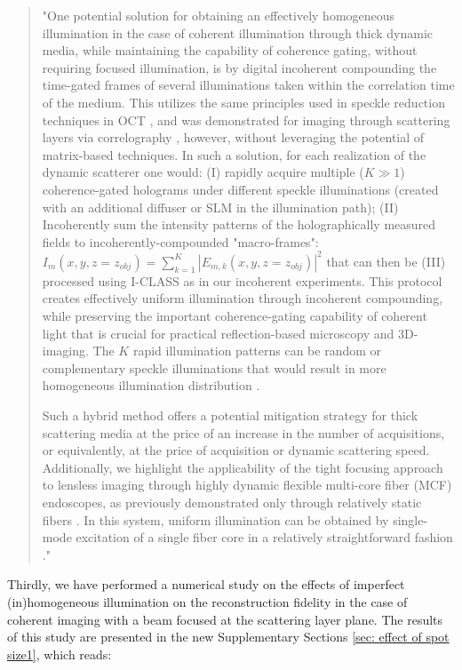 \documentclass[12pt]{article}
\newenvironment{finished_ourresponse}
    {\begin{tcolorbox}[width=\linewidth,breakable,enhanced,colback=gray!5,colframe=finished_responsecolor!50,title=Response,left=5pt,right=5pt]}
    {\end{tcolorbox}}
\begin{document}
\begin{finished_ourresponse}
\begin{quote}
     "One potential solution for obtaining an effectively homogeneous illumination in the case of coherent illumination through thick dynamic media, while maintaining the capability of coherence gating, without requiring focused illumination, is by digital incoherent compounding the time-gated frames of several illuminations taken within the correlation time of the medium. This utilizes the same principles used in speckle reduction techniques in OCT \cite{liba2017speckle}, and was demonstrated for imaging through scattering layers via correlography \cite{idell1987image, salhov2018depth, metzler2020deepinverse}, however, without leveraging the potential of matrix-based techniques.
     In such a solution, for each realization of the dynamic scatterer one would: (I) rapidly acquire multiple ($K \gg 1$) coherence-gated holograms under different speckle illuminations (created with an additional diffuser or SLM in the illumination path); (II) Incoherently sum the intensity patterns of the holographically measured fields to incoherently-compounded "macro-frames": $I_m(x,y,z=z_{obj}) = \sum_{k=1}^{K}|E_{m,k}(x,y,z=z_{obj})|^2$  that can then be (III) processed using I-CLASS as in our incoherent experiments.
     This protocol creates effectively uniform illumination through incoherent compounding, while preserving the important coherence-gating capability of coherent light that is crucial for practical reflection-based microscopy and 3D-imaging. The $K$ rapid illumination patterns can be random or complementary speckle illuminations that would result in more homogeneous illumination distribution \cite{gateau2017complementary}.

     Such a hybrid method offers a potential mitigation strategy for thick scattering media at the price of an increase in the number of acquisitions, or equivalently, at the price of acquisition or dynamic scattering speed.
     Additionally, we highlight the applicability of the tight focusing approach to lensless imaging through highly dynamic flexible multi-core fiber (MCF) endoscopes, as previously demonstrated only through relatively static fibers \cite{choi2022flexible, haim2025image}. In this system, uniform illumination can be obtained by single-mode excitation of a single fiber core in a relatively straightforward fashion \cite{choi2022flexible, weinberg2024ptychographic}."
     \end{quote}


Thirdly, we have performed a numerical study on the effects of imperfect (in)homogeneous illumination on the reconstruction fidelity in the case of coherent imaging with a beam focused at the scattering layer plane.
The results of this study are presented in the new Supplementary Sections  \ref{sec: effect of spot size1}, which reads:


\end{finished_ourresponse}
\end{document}
